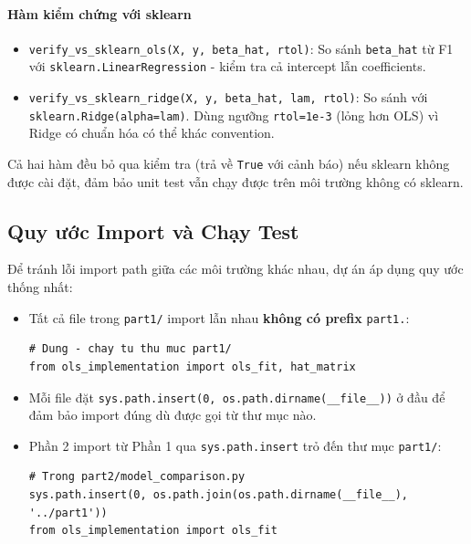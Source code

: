 \paragraph{Hàm kiểm chứng với sklearn}

\begin{itemize}
    \item \texttt{verify\_vs\_sklearn\_ols(X, y, beta\_hat, rtol)}: So sánh \texttt{beta\_hat} từ F1 với \texttt{sklearn.LinearRegression} - kiểm tra cả intercept lẫn coefficients.
    \item \texttt{verify\_vs\_sklearn\_ridge(X, y, beta\_hat, lam, rtol)}: So sánh với \texttt{sklearn.Ridge(alpha=lam)}. Dùng ngưỡng \texttt{rtol=1e-3} (lỏng hơn OLS) vì Ridge có chuẩn hóa có thể khác convention.
\end{itemize}

Cả hai hàm đều bỏ qua kiểm tra (trả về \texttt{True} với cảnh báo) nếu sklearn không được cài đặt, đảm bảo unit test vẫn chạy được trên môi trường không có sklearn.


\subsection{Quy ước Import và Chạy Test}

Để tránh lỗi import path giữa các môi trường khác nhau, dự án áp dụng quy ước thống nhất:

\begin{tcolorbox}[mycodebox, colback=gray!5!white, colframe=gray!50!black,
    title={\textbf{Quy tắc import path toàn dự án}}]
\begin{itemize}
    \item Tất cả file trong \texttt{part1/} import lẫn nhau \textbf{không có prefix} \texttt{part1.}:
    \begin{verbatim}
# Dung - chay tu thu muc part1/
from ols_implementation import ols_fit, hat_matrix
    \end{verbatim}
    \item Mỗi file đặt \texttt{sys.path.insert(0, os.path.dirname(\_\_file\_\_))} ở đầu để đảm bảo import đúng dù được gọi từ thư mục nào.
    \item Phần 2 import từ Phần 1 qua \texttt{sys.path.insert} trỏ đến thư mục \texttt{part1/}:
    \begin{verbatim}
# Trong part2/model_comparison.py
sys.path.insert(0, os.path.join(os.path.dirname(__file__), '../part1'))
from ols_implementation import ols_fit
    \end{verbatim}
\end{itemize}
\end{tcolorbox}

